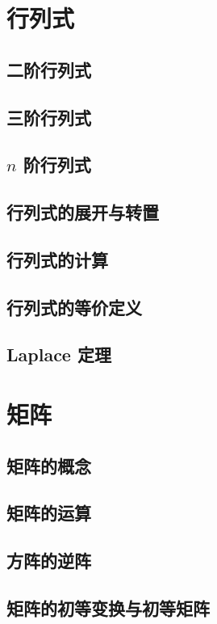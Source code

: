 \documentclass[a4paper, 11pt]{ctexbook}
\begin{document}
    \chapter{行列式}
        \section{二阶行列式}
            
        \section{三阶行列式}
            
        \section{\texorpdfstring{$n$}{n} 阶行列式}
            
        \section{行列式的展开与转置}
            
        \section{行列式的计算}
        \section{行列式的等价定义}
        \section{Laplace 定理}
    \chapter{矩阵}
        \section{矩阵的概念}
        \section{矩阵的运算}
            
        \section{方阵的逆阵}
            
        \section{矩阵的初等变换与初等矩阵}
            
\end{document}
